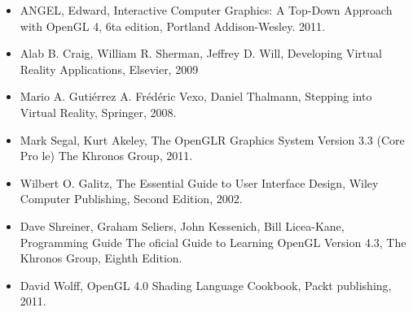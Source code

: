 \documentclass[a4paper,11pt]{article}
\theoremstyle{mytheor}
\begin{document}
\begin{itemize}
	\item ANGEL, Edward, Interactive Computer Graphics: A Top-Down Approach
with OpenGL 4, 6ta edition, Portland
Addison-Wesley. 2011.
	\item Alab B. Craig, William R. Sherman, Jeffrey D. Will, Developing Virtual
Reality Applications, Elsevier, 2009
	\item Mario A. Gutiérrez A. Frédéric Vexo, Daniel Thalmann, Stepping into Virtual
Reality, Springer, 2008.
	\item Mark Segal, Kurt Akeley, The OpenGLR Graphics System Version 3.3 (Core
Pro le) The Khronos Group, 2011.
	\item Wilbert O. Galitz, The Essential Guide to User Interface Design, Wiley
Computer Publishing, Second Edition, 2002.
	\item Dave Shreiner, Graham Seliers, John Kessenich, Bill Licea-Kane,
Programming Guide The oficial Guide to Learning
OpenGL Version
4.3, The Khronos Group, Eighth Edition.
	\item David Wolff, OpenGL 4.0 Shading Language Cookbook, Packt publishing,
2011.
\end{itemize}
\end{document}
